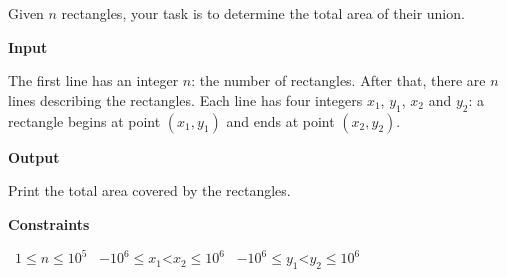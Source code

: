 Given $n$ rectangles, your task is to determine the total area of their union.

\vspace{0.3cm}\noindent\textbf{Input}

The first line has an integer $n$: the number of rectangles.
After that, there are $n$ lines describing the rectangles. Each line has four integers $x_1$, $y_1$, $x_2$ and $y_2$: a rectangle begins at point $(x_1,y_1)$ and ends at point $(x_2,y_2)$.

\vspace{0.3cm}\noindent\textbf{Output}

Print the total area covered by the rectangles.

\vspace{0.3cm}\noindent\textbf{Constraints}

\textbullet\ $1 \le n \le 10^5$
\textbullet\ $-10^6 \le x_1 $<$ x_2 \le 10^6$
\textbullet\ $-10^6 \le y_1 $<$ y_2 \le 10^6$